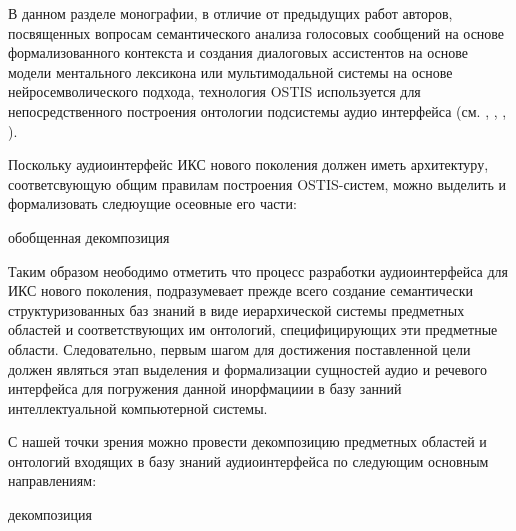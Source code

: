 В данном разделе монографии, в отличие от предыдущих работ авторов, посвященных вопросам семантического анализа голосовых сообщений на основе формализованного контекста и создания диалоговых ассистентов на основе модели ментального лексикона или мультимодальной системы на основе нейросемволического подхода, технология OSTIS используется для непосредственного построения онтологии подсистемы аудио интерфейса (см. , , , ).

Поскольку аудиоинтерфейс ИКС нового поколения должен иметь архитектуру, соответсвующую общим правилам построения OSTIS-систем, можно выделить и формализовать следюущие осеовные его части: 
\begin{SCn}
	\begin{scnrelfromset}{обобщенная декомпозиция}
	\end{scnrelfromset}
\end{SCn}

Таким образом неободимо отметить что процесс разработки аудиоинтерфейса для ИКС нового поколения, подразумевает прежде всего создание семантически структуризованных баз знаний в виде иерархической системы предметных областей и соответствующих им онтологий, специфицирующих эти предметные области. Следовательно, первым шагом для достижения поставленной цели должен являться этап выделения и формализации сущностей аудио и речевого интерфейса для погружения данной инорфмациии в базу занний интеллектуальной компьютерной системы.

С нашей точки зрения можно провести декомпозицию предметных областей и онтологий входящих в базу знаний аудиоинтерфейса по следующим основным направлениям:

\begin{SCn}
	\begin{scnreltoset}{декомпозиция}
	\end{scnreltoset}
\end{SCn}

